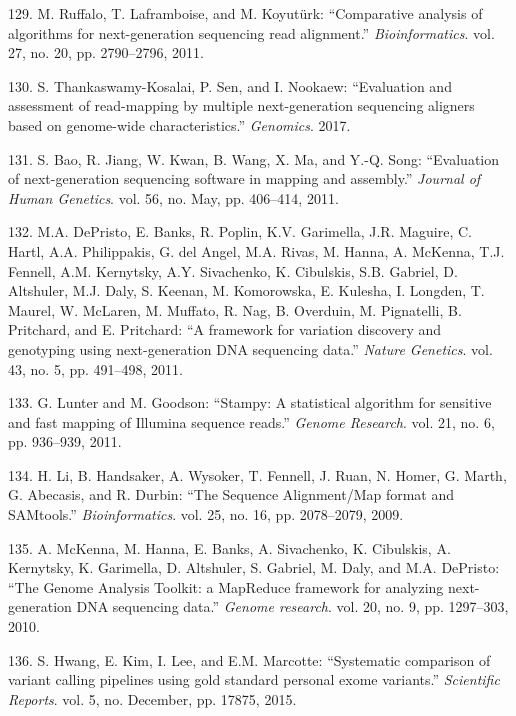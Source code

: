 \documentclass[12pt,twoside]{reedthesis}
\theoremstyle{definition}
\theoremstyle{definition}
\theoremstyle{remark}
\begin{document}
  \hypertarget{ref-Ruffalo2011}{}
  129. M. Ruffalo, T. Laframboise, and M. Koyutürk: ``Comparative analysis
  of algorithms for next-generation sequencing read alignment.''
  \emph{Bioinformatics}. vol. 27, no. 20, pp. 2790--2796, 2011.
  
  \hypertarget{ref-Thankaswamy-Kosalai2017}{}
  130. S. Thankaswamy-Kosalai, P. Sen, and I. Nookaew: ``Evaluation and
  assessment of read-mapping by multiple next-generation sequencing
  aligners based on genome-wide characteristics.'' \emph{Genomics}. 2017.
  
  \hypertarget{ref-Bao2011}{}
  131. S. Bao, R. Jiang, W. Kwan, B. Wang, X. Ma, and Y.-Q. Song:
  ``Evaluation of next-generation sequencing software in mapping and
  assembly.'' \emph{Journal of Human Genetics}. vol. 56, no. May, pp.
  406--414, 2011.
  
  \hypertarget{ref-DePristo2011}{}
  132. M.A. DePristo, E. Banks, R. Poplin, K.V. Garimella, J.R. Maguire,
  C. Hartl, A.A. Philippakis, G. del Angel, M.A. Rivas, M. Hanna, A.
  McKenna, T.J. Fennell, A.M. Kernytsky, A.Y. Sivachenko, K. Cibulskis,
  S.B. Gabriel, D. Altshuler, M.J. Daly, S. Keenan, M. Komorowska, E.
  Kulesha, I. Longden, T. Maurel, W. McLaren, M. Muffato, R. Nag, B.
  Overduin, M. Pignatelli, B. Pritchard, and E. Pritchard: ``A framework
  for variation discovery and genotyping using next-generation DNA
  sequencing data.'' \emph{Nature Genetics}. vol. 43, no. 5, pp. 491--498,
  2011.
  
  \hypertarget{ref-Lunter2011}{}
  133. G. Lunter and M. Goodson: ``Stampy: A statistical algorithm for
  sensitive and fast mapping of Illumina sequence reads.'' \emph{Genome
  Research}. vol. 21, no. 6, pp. 936--939, 2011.
  
  \hypertarget{ref-Li2009}{}
  134. H. Li, B. Handsaker, A. Wysoker, T. Fennell, J. Ruan, N. Homer, G.
  Marth, G. Abecasis, and R. Durbin: ``The Sequence Alignment/Map format
  and SAMtools.'' \emph{Bioinformatics}. vol. 25, no. 16, pp. 2078--2079,
  2009.
  
  \hypertarget{ref-McKenna2010}{}
  135. A. McKenna, M. Hanna, E. Banks, A. Sivachenko, K. Cibulskis, A.
  Kernytsky, K. Garimella, D. Altshuler, S. Gabriel, M. Daly, and M.A.
  DePristo: ``The Genome Analysis Toolkit: a MapReduce framework for
  analyzing next-generation DNA sequencing data.'' \emph{Genome research}.
  vol. 20, no. 9, pp. 1297--303, 2010.
  
  \hypertarget{ref-Hwang2015}{}
  136. S. Hwang, E. Kim, I. Lee, and E.M. Marcotte: ``Systematic
  comparison of variant calling pipelines using gold standard personal
  exome variants.'' \emph{Scientific Reports}. vol. 5, no. December, pp.
  17875, 2015.
  
\end{document}
